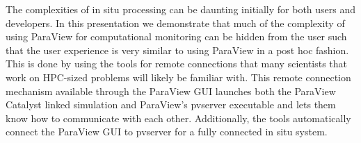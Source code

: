 
\license

The complexities of in situ processing can be daunting initially for both users and developers. In this presentation we demonstrate that much of the complexity of using ParaView for computational monitoring can be hidden from the user such that the user experience is very similar to using ParaView in a post hoc fashion. This is done by using the tools for remote connections that many scientists that work on HPC-sized problems will likely be familiar with. This remote connection mechanism available through the ParaView GUI launches both the ParaView Catalyst linked simulation and ParaView’s pvserver executable and lets them know how to communicate with each other. Additionally, the tools automatically connect the ParaView GUI to pvserver for a fully connected in situ system.

